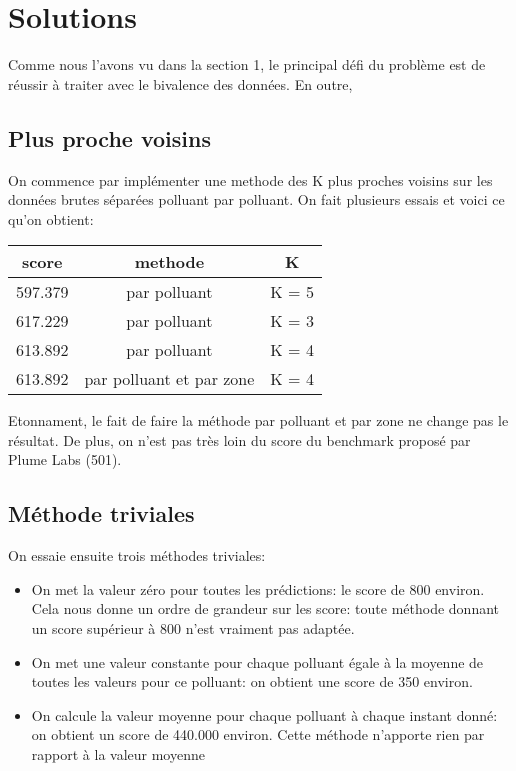\section{Solutions}

Comme nous l'avons vu dans la section 1, le principal défi du problème est de réussir à traiter avec le bivalence des données. En outre, 

\subsection{Plus proche voisins}

On commence par implémenter une methode des K plus proches voisins sur les données brutes séparées polluant par polluant.
On fait plusieurs essais et voici ce qu'on obtient:

\begin{tabular}{|c|c|c|}
  \hline
  score & methode & K \\
  \hline
  597.379 &  par polluant & K = 5\\
  \hline
  617.229 & par polluant & K = 3\\
  \hline
  613.892 & par polluant  & K = 4\\
  \hline
  613.892 & par polluant et par zone & K = 4\\
  \hline
\end{tabular}

Etonnament, le fait de faire la méthode par polluant et par zone ne change pas le résultat.
De plus, on n'est pas très loin du score du benchmark proposé par Plume Labs (501).

\subsection{Méthode triviales}

On essaie ensuite trois méthodes triviales:
\begin{itemize}
  \item
    On met la valeur zéro pour toutes les prédictions: le score de 800 environ.
    Cela nous donne un ordre de grandeur sur les score: toute méthode donnant un score supérieur à 800 n'est vraiment pas adaptée.
  \item
    On met une valeur constante pour chaque polluant égale à la moyenne de toutes les valeurs pour ce polluant: on obtient une score de 350 environ.
  \item
    On calcule la valeur moyenne pour chaque polluant à chaque instant donné: on obtient un score de 440.000 environ.
    Cette méthode n'apporte rien par rapport à la valeur moyenne %
\end{itemize}

